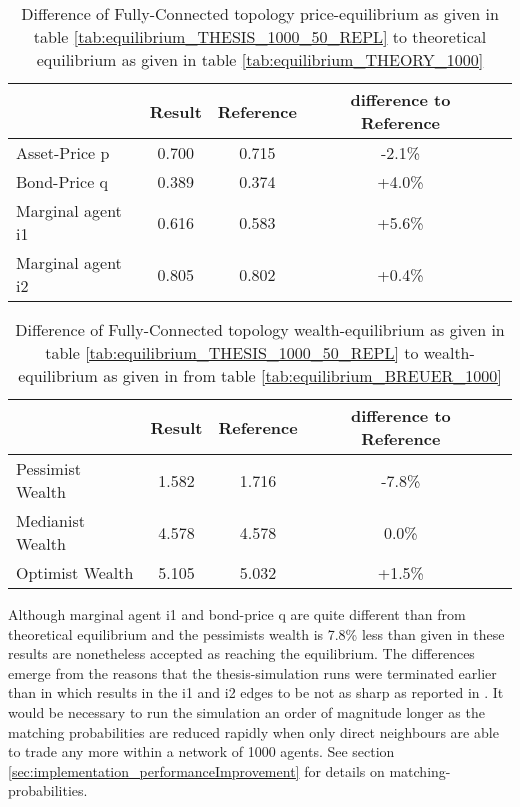\documentclass[Bachelorarbeit.tex]{subfiles}
\begin{document}
\begin{table}[H]
	\caption{Difference of Fully-Connected topology price-equilibrium as given in table \ref{tab:equilibrium_THESIS_1000_50_REPL} to theoretical equilibrium as given in table \ref{tab:equilibrium_THEORY_1000}}
	\centering
	\begin{tabular} { l c c c r }
		& Result & Reference & difference to Reference \\
		\hline
		Asset-Price p & 0.700 & 0.715 & -2.1\% \\
		Bond-Price q & 0.389 & 0.374 & +4.0\% \\
		Marginal agent i1 & 0.616  & 0.583 & +5.6\% \\
		Marginal agent i2 & 0.805 & 0.802 & +0.4\% \\
		\hline
	\end{tabular}
\end{table} 

\begin{table}[H]
	\caption{Difference of Fully-Connected topology wealth-equilibrium as given in table \ref{tab:equilibrium_THESIS_1000_50_REPL} to wealth-equilibrium as given in \cite{Breuer2015} from table \ref{tab:equilibrium_BREUER_1000}}
	\centering
	\begin{tabular} { l c c c r }
		& Result & Reference & difference to Reference \\
		\hline
		Pessimist Wealth  & 1.582 & 1.716 & -7.8\% \\
		Medianist Wealth & 4.578 & 4.578 & 0.0\% \\
		Optimist Wealth & 5.105 & 5.032 & +1.5\% \\
		\hline
	\end{tabular}
\end{table} 

Although marginal agent i1 and bond-price q are quite different than from theoretical equilibrium and the pessimists wealth is 7.8\% less than given in \cite{Breuer2015} these results are nonetheless accepted as reaching the equilibrium. The differences emerge from the reasons that the thesis-simulation runs were terminated earlier than in \cite{Breuer2015} which results in the i1 and i2 edges to be not as sharp as reported in \cite{Breuer2015}. It would be necessary to run the simulation an order of magnitude longer as the matching probabilities are reduced rapidly when only direct neighbours are able to trade any more within a network of 1000 agents. See section \ref{sec:implementation_performanceImprovement} for details on matching-probabilities.
\end{document}

